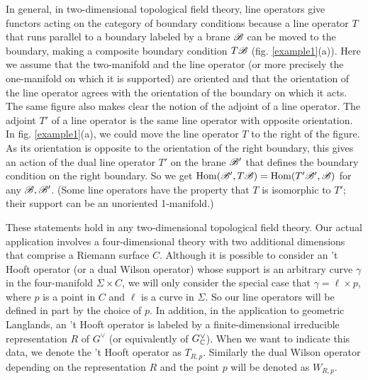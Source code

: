 \documentclass[11pt,a4paper]{article}
\begin{document}
In general, in two-dimensional topological
field theory, line operators give functors acting on the category of  boundary conditions because a line operator $T$ that runs parallel to a boundary
labeled by a brane ${\mathscr B}$ can be moved  to the boundary, making a composite boundary condition $T{\mathscr B}$ (fig. \ref{example1}(a)).   
Here we assume that the two-manifold and the line operator (or more precisely the one-manifold on which it is supported)
are oriented and that the orientation of the line operator agrees with the orientation of the boundary on which it acts. 
 The same
figure also makes clear the notion of the adjoint of a line operator.   The adjoint $T'$ of a line operator is the same line operator with opposite orientation.
In fig. \ref{example1}(a), we could move the line operator $T$ to the right of the figure.   As its orientation is opposite to the orientation of the right
boundary, this gives an action of the dual line operator $T'$ on the brane ${\mathscr B}'$ that defines the boundary condition on the right boundary.
  So we get ${\mathrm{Hom}}({\mathscr B}',T{\mathscr B})={\mathrm{Hom}}(T'{\mathscr B}',{\mathscr B})$ for any ${\mathscr B},{\mathscr B}'$.   (Some line operators have the property that $T$ is isomorphic to $T'$; their support
  can be an unoriented 1-manifold.)   
  
  These statements hold in any two-dimensional topological field theory.   Our actual application involves a four-dimensional theory with two additional dimensions
  that comprise a Riemann surface $C$.   Although it is possible to consider an 't Hooft operator (or a dual Wilson operator)
  whose support is an arbitrary curve $\gamma$ in the four-manifold
  $\Sigma\times C$, we will only consider the special case that $\gamma=\ell\times p$, where $p$ is a point in $C$ and $\ell$ is a curve in $\Sigma$.  So
  our line operators will be defined in part by the choice of $p$.
  In addition, in the application to geometric Langlands, an 't Hooft operator is labeled by a  finite-dimensional irreducible
  representation $R$ of $G^\vee$ (or equivalently of $G^\vee_{\mathbb C}$).   When we want to indicate
  this data, we denote the 't Hooft operator as $T_{R,p}$.
Similarly the  dual Wilson operator depending on the representation $R$ and the point $p$ will be denoted as $W_{R,p}$.
\end{document}
